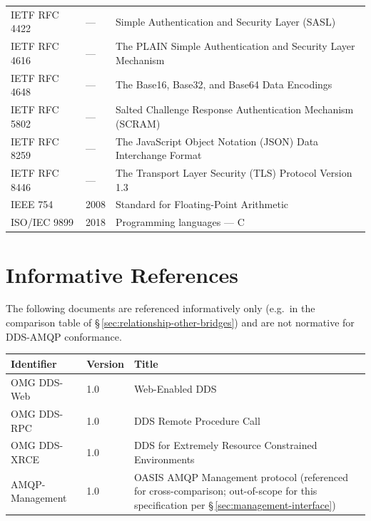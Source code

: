 \documentclass{../styles/zerodds-vendor-spec}
\begin{document}
\begin{longtable}{p{3.2cm}p{2.0cm}p{8.5cm}}
  IETF RFC 4422        & ---         & Simple Authentication and Security Layer (SASL)\\
  IETF RFC 4616        & ---         & The PLAIN Simple Authentication and Security Layer Mechanism\\
  IETF RFC 4648        & ---         & The Base16, Base32, and Base64 Data Encodings\\
  IETF RFC 5802        & ---         & Salted Challenge Response Authentication Mechanism (SCRAM)\\
  IETF RFC 8259        & ---         & The JavaScript Object Notation (JSON) Data Interchange Format\\
  IETF RFC 8446        & ---         & The Transport Layer Security (TLS) Protocol Version 1.3\\
  IEEE 754             & 2008        & Standard for Floating-Point Arithmetic\\
  ISO/IEC 9899         & 2018        & Programming languages --- C\\
  \bottomrule
\end{longtable}

\section*{Informative References}

The following documents are referenced informatively only (e.g.\
in the comparison table of \S\,\ref{sec:relationship-other-bridges})
and are not normative for DDS-AMQP conformance.

\begin{longtable}{p{3.4cm}p{2.0cm}p{8.5cm}}
  \toprule
  \textbf{Identifier} & \textbf{Version} & \textbf{Title} \\
  \midrule
  \endhead
  OMG DDS-Web          & 1.0         & Web-Enabled DDS \\
  OMG DDS-RPC          & 1.0         & DDS Remote Procedure Call \\
  OMG DDS-XRCE         & 1.0         & DDS for Extremely Resource Constrained Environments \\
  AMQP-Management      & 1.0         & OASIS AMQP Management protocol (referenced for cross-comparison; out-of-scope for this specification per \S\,\ref{sec:management-interface}) \\
  \bottomrule
\end{longtable}

\end{document}
